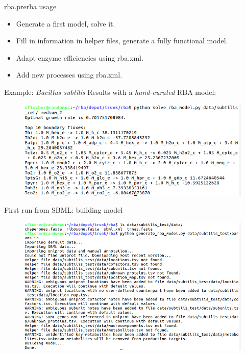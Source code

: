 \documentclass{beamer}
\begin{document}
\begin{frame}{rba.prerba usage}
  \begin{itemize}
    \item Generate a first model, solve it.
    \item Fill in information in helper files, generate a fully functional
    model.
    \item Adapt enzyme efficiencies using rba.xml.
    \item Add new processes using rba.xml.
  \end{itemize}
\end{frame}

\begin{frame}{Example: \textit{Bacillus subtilis}}
  Results with a \emph{hand-curated} RBA model:
  \begin{figure}
    \centering
    \includegraphics[width=\linewidth]{subtilis_ref}
  \end{figure}
\end{frame}

\begin{frame}{First run from SBML: building model}
  \begin{figure}
    \centering
    \includegraphics[width=\linewidth]{first_run}
  \end{figure}
\end{frame}
\end{document}
